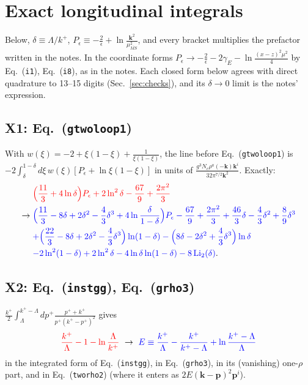 \documentclass[10pt]{article}
\def\v#1{\mathbf{#1}}
\newcommand{\old}[1]{{\color{red}#1}}
\newcommand{\new}[1]{{\color{blue}#1}}
\newcommand{\eqn}[1]{Eq.~(\texttt{#1})}
\newcommand{\Li}{\mathrm{Li}_2}
\begin{document}
\section{Exact longitudinal integrals}
Below, $\delta\equiv\Lambda/k^+$, $P_\epsilon\equiv-\frac2\epsilon+\ln\frac{\v k^2}{\mu^2_{\overline{MS}}}$, and every bracket multiplies the prefactor written in the notes. In the coordinate forms $P_\epsilon\to-\frac2\epsilon-2\gamma_E-\ln\frac{(x-z)^2\mu^2}{4}$ by \eqn{i1}, \eqn{i8}, as in the notes. Each closed form below agrees with direct quadrature to 13--15 digits (Sec.~\ref{sec:checks}), and its $\delta\to0$ limit is the notes' expression.

\subsection{X1: \eqn{gtwoloop1}}\label{sec:X1}
With $w(\xi)=-2+\xi(1-\xi)+\frac{1}{\xi(1-\xi)}$, the line before \eqn{gtwoloop1} is $-2\int_\delta^{1-\delta}d\xi\,w(\xi)[P_\epsilon+\ln\xi(1-\xi)]$ in units of $\frac{g^3N_c\rho^a(-\v k)\v k^i}{32\pi^{7/2}\v k^2}$. Exactly:
\begin{align}
&\old{\Big(\frac{11}{3}+4\ln\delta\Big)P_\epsilon+2\ln^2\delta-\frac{67}{9}+\frac{2\pi^2}{3}}\notag\\
\to{}&\new{\Big(\frac{11}{3}-8\delta+2\delta^2-\frac43\delta^3+4\ln\frac{\delta}{1-\delta}\Big)P_\epsilon-\frac{67}{9}+\frac{2\pi^2}{3}+\frac{46}{3}\delta-\frac43\delta^2+\frac89\delta^3}\notag\\
&\new{+\Big(\frac{22}{3}-8\delta+2\delta^2-\frac43\delta^3\Big)\ln(1-\delta)-\Big(8\delta-2\delta^2+\frac43\delta^3\Big)\ln\delta}\notag\\
&\new{-2\ln^2(1-\delta)+2\ln^2\delta-4\ln\delta\ln(1-\delta)-8\,\Li(\delta)}.
\end{align}

\subsection{X2: \eqn{instgg}, \eqn{grho3}}
$\frac{k^+}{2}\int_\Lambda^{k^+-\Lambda}dp^+\frac{p^++k^+}{p^+(k^+-p^+)^2}$ gives
\begin{equation}
\old{\frac{k^+}{\Lambda}-1-\ln\frac{\Lambda}{k^+}}\ \to\ \new{E\equiv\frac{k^+}{\Lambda}-\frac{k^+}{k^+-\Lambda}+\ln\frac{k^+-\Lambda}{\Lambda}}
\end{equation}
in the integrated form of \eqn{instgg}, in \eqn{grho3}, in its (vanishing) one-$\rho$ part, and in \eqn{tworho2} (where it enters as $2E(\v k-\v p)^2\v p^i$).
\end{document}
